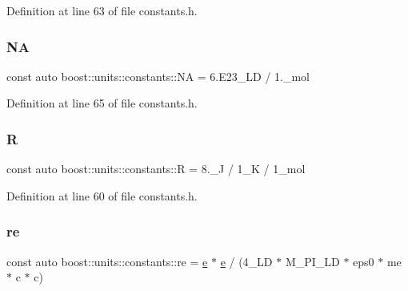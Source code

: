 Definition at line 63 of file constants.\+h.

\hypertarget{namespaceboost_1_1units_1_1constants_a7f9d392dceaa7bbe31525aa275c6489d}{}\label{namespaceboost_1_1units_1_1constants_a7f9d392dceaa7bbe31525aa275c6489d} 
\subsubsection{\texorpdfstring{NA}{NA}}
{\footnotesize\ttfamily const auto boost\+::units\+::constants\+::\+NA = 6.\+E23\+\_\+\+L\+D / 1.\+\_\+mol}



Definition at line 65 of file constants.\+h.

\hypertarget{namespaceboost_1_1units_1_1constants_a2d0c094390643c2ba3ac40a3ebdd9dd5}{}\label{namespaceboost_1_1units_1_1constants_a2d0c094390643c2ba3ac40a3ebdd9dd5} 
\subsubsection{\texorpdfstring{R}{R}}
{\footnotesize\ttfamily const auto boost\+::units\+::constants\+::R = 8.\+\_\+\+J / 1\+\_\+\+K / 1\+\_\+mol}



Definition at line 60 of file constants.\+h.

\hypertarget{namespaceboost_1_1units_1_1constants_a04a77f0765f257052437d49d8cc5440a}{}\label{namespaceboost_1_1units_1_1constants_a04a77f0765f257052437d49d8cc5440a} 
\subsubsection{\texorpdfstring{re}{re}}
{\footnotesize\ttfamily const auto boost\+::units\+::constants\+::re = \hyperlink{namespaceboost_1_1units_1_1constants_a0e10024b337b34c7f7300c67f0e9fcb1}{e} $\ast$ \hyperlink{namespaceboost_1_1units_1_1constants_a0e10024b337b34c7f7300c67f0e9fcb1}{e} / (4\+\_\+\+L\+D $\ast$ M\+\_\+\+P\+I\+\_\+\+L\+D $\ast$ eps0 $\ast$ me $\ast$ c $\ast$ c)}



